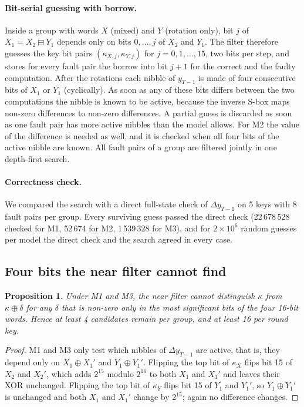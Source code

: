 \documentclass[11pt,a4paper]{article}
\newtheorem{proposition}{Proposition}
\begin{document}
\paragraph{Bit-serial guessing with borrow.} Inside a group with words $X$ (mixed) and $Y$
(rotation only), bit $j$ of $X_1 = X_2 \boxminus Y_1$ depends only on bits $0,\dots,j$ of
$X_2$ and $Y_1$. The filter therefore guesses the key bit pairs $(\kappa_{X,j},\kappa_{Y,j})$ for
$j=0,1,\dots,15$, two bits per step, and stores for every fault pair the borrow into bit $j+1$
for the correct and the faulty computation. After the rotations each nibble of $y_{T-1}$ is
made of four consecutive bits of $X_1$ or $Y_1$ (cyclically). As soon as any of these bits
differs between the two computations the nibble is known to be active, because the inverse
S-box maps non-zero differences to non-zero differences. A partial guess is discarded as soon
as one fault pair has more active nibbles than the model allows. For M2 the value of the
difference is needed as well, and it is checked when all four bits of the active nibble are
known. All fault pairs of a group are filtered jointly in one depth-first search.

\paragraph{Correctness check.} We compared the search with a direct full-state check of
$\Delta y_{T-1}$ on 5 keys with 8 fault pairs per group. Every surviving guess passed the direct
check (22\,678\,528 checked for M1, 52\,674 for M2, 1\,539\,328 for M3), and for $2\times10^6$
random guesses per model the direct check and the search agreed in every case.

\subsection{Four bits the near filter cannot find}

\begin{proposition}\label{prop:msb}
Under M1 and M3, the near filter cannot distinguish $\kappa$ from $\kappa\oplus\delta$ for any
$\delta$ that is non-zero only in the most significant bits of the four 16-bit words. Hence at
least 4 candidates remain per group, and at least 16 per round key.
\end{proposition}
\begin{proof}
M1 and M3 only test which nibbles of $\Delta y_{T-1}$ are active, that is, they depend only on
$X_1\oplus X_1'$ and $Y_1\oplus Y_1'$. Flipping the top bit of $\kappa_X$ flips bit 15 of $X_2$ and
$X_2'$, which adds $2^{15}$ modulo $2^{16}$ to both $X_1$ and $X_1'$ and leaves their XOR
unchanged. Flipping the top bit of $\kappa_Y$ flips bit 15 of $Y_1$ and $Y_1'$, so $Y_1\oplus Y_1'$
is unchanged and both $X_1$ and $X_1'$ change by $2^{15}$; again no difference changes.
\end{proof}
\end{document}
